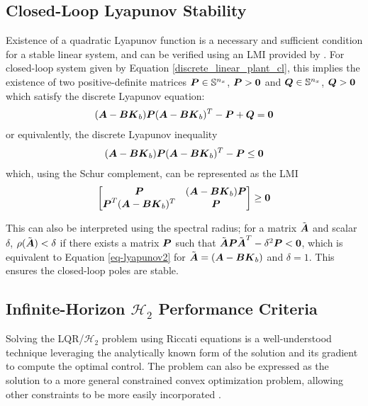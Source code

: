 \subsection{Closed-Loop Lyapunov Stability}
Existence of a quadratic Lyapunov function is a necessary and sufficient condition for a stable linear system, and can be verified using an LMI provided by \cite{bernstein2009matrix,caverly2019lmi}.  For closed-loop system given by Equation \eqref{discrete_linear_plant_cl}, this implies the existence of two positive-definite matrices $\vb*{P} \in \mathbb{S}^{n_{x}}$, $\vb*{P} > \vb*{0}$ and $\vb*{Q} \in \mathbb{S}^{n_{x}}$, $\vb*{Q} > \vb*{0}$ which satisfy the discrete Lyapunov equation:
\begin{equation}
\label{eq-lyapunov}
\begin{aligned}
	(\vb*{A} - \vb*{B}\vb*{K}_{b}) \vb*{P} (\vb*{A} - \vb*{B}\vb*{K}_{b})^{T} - \vb*{P} + \vb*{Q} = \vb*{0}
\end{aligned}
\end{equation}
or equivalently, the discrete Lyapunov inequality
\begin{equation}
\label{eq-lyapunov2}
\begin{aligned}
	(\vb*{A} - \vb*{B}\vb*{K}_{b}) \vb*{P} (\vb*{A} - \vb*{B}\vb*{K}_{b})^{T} - \vb*{P} \leq \vb*{0}
\end{aligned}
\end{equation}
which, using the Schur complement, can be represented as the LMI
\begin{equation}
\label{eq-lyapunov-lmi}
\begin{aligned}
	\begin{bmatrix}
		\vb*{P} & (\vb*{A} - \vb*{B}\vb*{K}_{b})\vb*{P}\\
		\vb*{P}^{T}(\vb*{A} - \vb*{B}\vb*{K}_{b})^{T} & \vb*{P}\\
	\end{bmatrix} \geq \vb*{0}
\end{aligned}
\end{equation}

This can also be interpreted using the spectral radius; for a matrix $\tilde{\vb*{A}}$ and scalar $\delta$, $\rho(\tilde{\vb*{A}}) < \delta$ if there exists a matrix $\vb*{P}$ such that $\tilde{\vb*{A}}\vb*{P}\tilde{\vb*{A}}^{T} - \delta^{2}\vb*{P} < \vb*{0}$, which is equivalent to Equation \eqref{eq-lyapunov2} for $\tilde{\vb*{A}} = (\vb*{A} - \vb*{B}\vb*{K}_{b})$ and $\delta = 1$.  This ensures the closed-loop poles are stable.

\subsection{Infinite-Horizon $\mathcal{H}_{2}$ Performance Criteria}
Solving the LQR/$\mathcal{H}_{2}$ problem using Riccati equations is a well-understood technique leveraging the analytically known form of the solution and its gradient to compute the optimal control.  The problem can also be expressed as the solution to a more general constrained convex optimization problem, allowing other constraints to be more easily incorporated \cite{wang2014localized, anderson2019system}.

